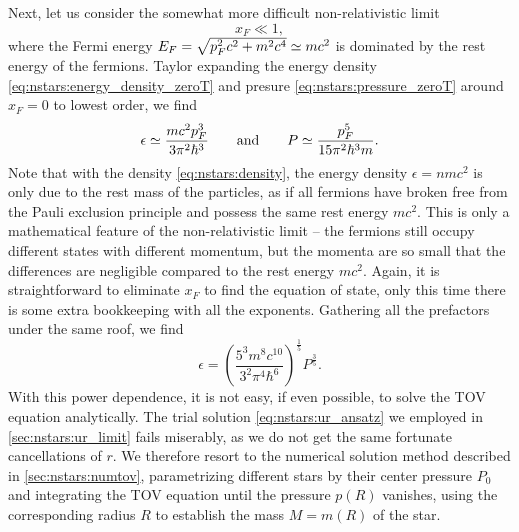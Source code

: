 Next, let us consider the somewhat more difficult non-relativistic limit
\begin{equation}
	x_F \ll 1,
\label{eq:nstars:nr_limit}
\end{equation}
where the Fermi energy $E_F = \sqrt{p_F^2 c^2 + m^2 c^4} \simeq m c^2$ is dominated by the rest energy of the fermions.
Taylor expanding the energy density \eqref{eq:nstars:energy_density_zeroT} and presure \eqref{eq:nstars:pressure_zeroT} around $x_F = 0$ to lowest order, we find
\begin{equation}
	\epsilon \simeq \frac{m c^2 p_F^3}{3 \pi^2 \hbar^3}
	\qquad \text{and} \qquad
	P        \simeq \frac{p_F^5}{15 \pi^2 \hbar^3 m} .
\end{equation}
Note that with the density \eqref{eq:nstars:density}, the energy density $\epsilon = n m c^2$ is only due to the rest mass of the particles, as if all fermions have broken free from the Pauli exclusion principle and possess the same rest energy $m c^2$.
This is only a mathematical feature of the non-relativistic limit -- the fermions still occupy different states with different momentum, but the momenta are so small that the differences are negligible compared to the rest energy $mc^2$.
Again, it is straightforward to eliminate $x_F$ to find the equation of state, only this time there is some extra bookkeeping with all the exponents.
Gathering all the prefactors under the same roof, we find
\begin{equation}
	\epsilon = \left( \frac{5^3 m^8 c^{10}}{3^2 \pi^4 \hbar^6} \right)^{\frac15}  P^{\frac35} .
\end{equation}
With this power dependence, it is not easy, if even possible, to solve the TOV equation analytically.
The trial solution \eqref{eq:nstars:ur_ansatz} we employed in \cref{sec:nstars:ur_limit} fails miserably, as we do not get the same fortunate cancellations of $r$.
We therefore resort to the numerical solution method described in \cref{sec:nstars:numtov}, parametrizing different stars by their center pressure $P_0$ and integrating the TOV equation until the pressure $p(R)$ vanishes, using the corresponding radius $R$ to establish the mass $M = m(R)$ of the star.

\iffalse
Dimensionless equation of state
\begin{equation}
	\diml{\epsilon} = \left[ \frac{4^2 5^3}{3^4 \pi^2} \frac{m^8 c^6 r_0^6}{m_0^2 \hbar^6} \diml{P}^3 \right]^{\frac{1}{5}}
\end{equation}
\fi

